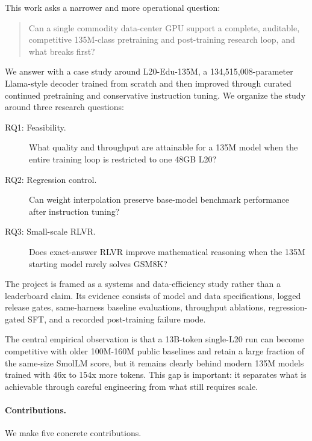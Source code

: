 \documentclass[11pt]{article}
\newcommand{\model}{L20-Edu-135M}
\begin{document}
This work asks a narrower and more operational question:

\begin{quote}
Can a single commodity data-center GPU support a complete, auditable, competitive 135M-class pretraining and post-training research loop, and what breaks first?
\end{quote}

We answer with a case study around \model, a 134,515,008-parameter Llama-style decoder trained from scratch and then improved through curated continued pretraining and conservative instruction tuning. We organize the study around three research questions:
\begin{description}
  \item[RQ1: Feasibility.] What quality and throughput are attainable for a 135M model when the entire training loop is restricted to one 48GB L20?
  \item[RQ2: Regression control.] Can weight interpolation preserve base-model benchmark performance after instruction tuning?
  \item[RQ3: Small-scale RLVR.] Does exact-answer RLVR improve mathematical reasoning when the 135M starting model rarely solves GSM8K?
\end{description}
The project is framed as a systems and data-efficiency study rather than a leaderboard claim. Its evidence consists of model and data specifications, logged release gates, same-harness baseline evaluations, throughput ablations, regression-gated SFT, and a recorded post-training failure mode.

The central empirical observation is that a 13B-token single-L20 run can become competitive with older 100M-160M public baselines and retain a large fraction of the same-size SmolLM score, but it remains clearly behind modern 135M models trained with 46x to 154x more tokens. This gap is important: it separates what is achievable through careful engineering from what still requires scale.

\paragraph{Contributions.}
We make five concrete contributions.
\end{document}
